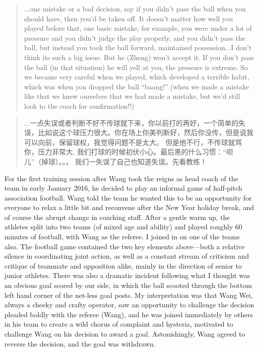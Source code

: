 \begin{CJK}{UTF8}{gbsn}
  \begin{quotation}
    ...one mistake or a bad decision, say if you didn't pass the ball when you should have, then you'd be taken off.  It doesn't matter how well you played before that, one basic mistake, for example, you were under a lot of pressure and you didn't judge the play properly, and you didn't pass the ball, but instead you took the ball forward, maintained possession...I don't think its such a big issue.
    But he (Zheng) won't accept it.  If you don't pass the ball (in that situation) he will yell at you, the pressure is extreme.  So we became very careful when we played, which developed a terrible habit, which was when you dropped the ball ``baang!'' (when we made a mistake like that we knew ourselves that we had made a mistake, but we'd still look to the coach for confirmation!!)
  \end{quotation}


  \begin{quotation}
    ...一点失误或者判断不好不传球就下来，你以前打的再好，一个简单的失误，比如说这个球压力很大。你在场上你美判断好，然后你没传，但是说我可以向前，保留球权，我觉得问题不是太大。
    但是他不行，不传球就骂你，压力非常大, 我们打球的时候初伏小心。最后黑的什么习惯：“呗儿”（掉球）。。。 我们一失误了自己也知道失误。先看教练！
  \end{quotation}





  For the first training session after Wang took the reigns as head coach of the team in early January 2016, he decided to play an informal game of half-pitch association football.  Wang told the team he wanted this to be an opportunity for everyone to relax a little bit and reconvene after the New Year holiday break, and of course the abrupt change in coaching staff. After a gentle warm up, the athletes split into two teams (of mixed age and ability) and played roughly 60 minutes of football, with Wang as the referee.  I joined in on one of the teams also.  The football game contained the two key elements above---both a relative silence in coordinating joint action, as well as a constant stream of criticism and critique of teammate and opposition alike, mainly in the direction of senior to junior athletes.  There was also a dramatic incident following what I thought was an obvious goal scored by our side, in which the ball scooted through the bottom left hand corner of the net-less goal posts. My interpretation was that Wang Wei, always a cheeky and crafty operator, saw an opportunity to challenge the decision  pleaded boldly with the referee (Wang), and he was joined immediately by others in his team to create a wild chorus of complaint and hysteria, motivated to challenge Wang on his decision to award a goal.  Astonishingly, Wang agreed to reverse the decision, and the goal was withdrawn.


\end{CJK}
